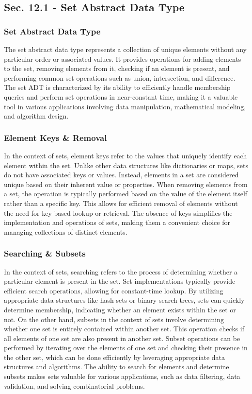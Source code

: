 \subsection*{Sec. 12.1 - Set Abstract Data Type}

\subsubsection{Set Abstract Data Type}

The set abstract data type represents a collection of unique elements without any particular order or associated values. It provides operations for adding elements to the set, removing elements from it, checking if an element is present, and performing common set operations such as union, intersection, and difference. The set ADT is 
characterized by its ability to efficiently handle membership queries and perform set operations in near-constant time, making it a valuable tool in various applications involving data manipulation, mathematical modeling, and algorithm design.

\subsubsection{Element Keys \& Removal}

In the context of sets, element keys refer to the values that uniquely identify each element within the set. Unlike other data structures like dictionaries or maps, sets do not have associated keys or values. Instead, elements in a set are considered unique based on their inherent value or properties. When removing elements from a set, 
the operation is typically performed based on the value of the element itself rather than a specific key. This allows for efficient removal of elements without the need for key-based lookup or retrieval. The absence of keys simplifies the implementation and operations of sets, making them a convenient choice for managing collections of 
distinct elements.

\subsubsection{Searching \& Subsets}

In the context of sets, searching refers to the process of determining whether a particular element is present in the set. Set implementations typically provide efficient search operations, allowing for constant-time lookup. By utilizing appropriate data structures like hash sets or binary search trees, sets can quickly determine membership, 
indicating whether an element exists within the set or not. On the other hand, subsets in the context of sets involve determining whether one set is entirely contained within another set. This operation checks if all elements of one set are also present in another set. Subset operations can be performed by iterating over the elements of one 
set and checking their presence in the other set, which can be done efficiently by leveraging appropriate data structures and algorithms. The ability to search for elements and determine subsets makes sets valuable for various applications, such as data filtering, data validation, and solving combinatorial problems.

